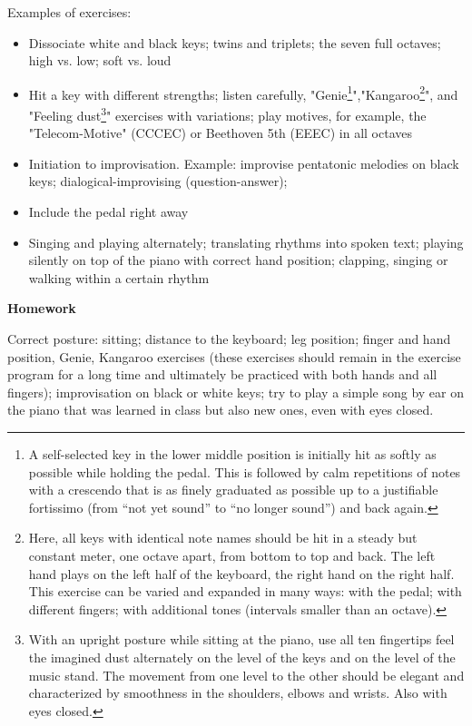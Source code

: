 Examples of exercises:
\begin{itemize}
\item Dissociate white and black keys; twins and triplets; the seven full octaves; high vs. low;
soft vs. loud
\item Hit a key with different strengths; listen carefully, "Genie\footnote{A self-selected key in the lower middle position is initially hit as softly as possible while holding the pedal. This is followed by calm repetitions of notes with a crescendo that is as finely graduated as possible up to a justifiable fortissimo (from “not yet sound” to “no longer sound”) and back again.}","Kangaroo\footnote{Here, all keys with identical note names should be hit in a steady but constant meter, one octave apart, from bottom to top and back. The left hand plays on the left half of the keyboard, the right hand on the right half. This exercise can be varied and expanded in many ways: with the pedal; with different fingers; with additional tones (intervals smaller than an octave).}", and "Feeling
dust\footnote{With an upright posture while sitting at the piano, use all ten fingertips feel the imagined dust alternately on the level of the keys and on the level of the music stand. The movement from one level to the other should be elegant and characterized by smoothness in the shoulders, elbows and wrists. Also with eyes closed.}" exercises with variations; play motives, for example, the "Telecom-Motive"
(CCCEC) or Beethoven 5th (EEEC) in all octaves
\item Initiation to improvisation. Example: improvise pentatonic melodies on black keys;
dialogical-improvising (question-answer);
\item Include the pedal right away
\item Singing and playing alternately; translating rhythms into spoken text; playing silently on
top of the piano with correct hand position; clapping, singing or walking within a certain rhythm
\end{itemize}

\textbf{Homework}

Correct posture: sitting; distance to the keyboard; leg position; finger and hand position, Genie, Kangaroo exercises (these exercises should remain in the exercise program for a long time and ultimately be practiced with both hands and all fingers); improvisation on black or white keys; try to play a simple song by ear on the piano that was learned in class but also new ones, even with eyes closed.

